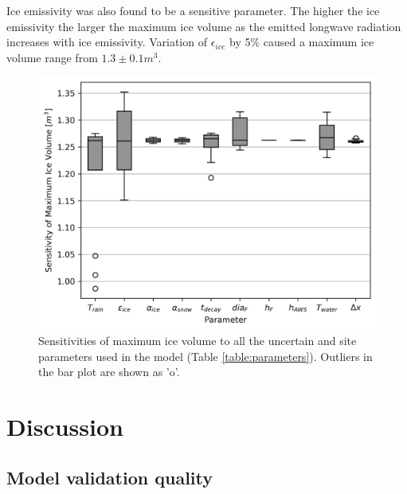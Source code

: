\documentclass[utf8]{frontiersSCNS} %
\begin{document}
Ice emissivity was also found to be a sensitive parameter. The higher the ice emissivity the larger the maximum ice
volume as the emitted longwave radiation increases with ice emissivity. Variation of $\epsilon_{ice}$ by 5\% caused a
maximum ice volume range from $1.3 \pm 0.1 m^3$. 

  \begin{figure} \begin{center} \includegraphics[width=10 cm]{Figures/Figure_9.jpg} \end{center} \caption{Sensitivities
of maximum ice volume to all the uncertain and site parameters used in the model (Table \ref{table:parameters}).
Outliers in the bar plot are shown as 'o'.} \label{fig:sensitivity} \end{figure}
  

\section{Discussion}

\subsection{Model validation quality}
\end{document}
